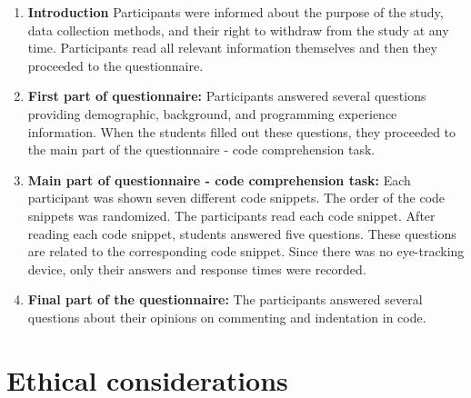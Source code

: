 \begin{enumerate}
    \item \textbf{Introduction} Participants were informed about the purpose of the study, data collection methods, and their right to withdraw from the study at any time. Participants read all relevant information themselves and then they proceeded to the questionnaire.
    
    \item \textbf{First part of questionnaire:}
    Participants answered several questions providing demographic, background, and programming experience information. When the students filled out these questions, they proceeded to the main part of the questionnaire - code comprehension task.

    \item \textbf{Main part of questionnaire - code comprehension task:} Each participant was shown seven different code snippets. The order of the code snippets was randomized. The participants read each code snippet. After reading each code snippet, students answered five questions. These questions are related to the corresponding code snippet. Since there was no eye-tracking device, only their answers and response times were recorded.

    \item \textbf{Final part of the questionnaire:}
    The participants answered several questions about their opinions on commenting and indentation in code.
\end{enumerate}




\section{Ethical considerations}

